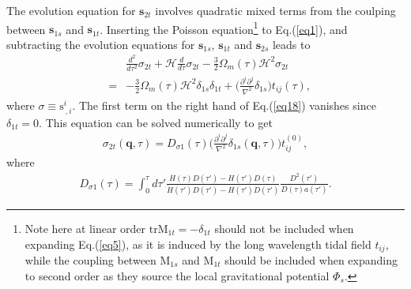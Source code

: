 \documentclass[aps,prd,twocolumn,showpacs,superscriptaddress,groupedaddress,nofootinbib]{revtex4}  %
\newcommand{\mr}{\mathrm}
\newcommand{\mb}{\mathbf}
\begin{document}
The evolution equation for $\mb{s}_{2t}$ involves quadratic mixed terms from
the coulping between $\mb{s}_{1s}$ and $\mb{s}_{1t}$. Inserting the Poisson 
equation\footnote{Note here at linear order $\mr{tr}\mr{M}_{1t}=-\delta_{1t}$
should not be included when expanding Eq.(\ref{eq5}), as it is induced by the 
long wavelength tidal field $t_{ij}$, while the coupling between $\mr{M}_{1s}$ 
and $\mr{M}_{1t}$ should be included when expanding to second order as they 
source the local gravitational potential $\Phi_s$.}
to Eq.(\ref{eq1}), and subtracting the evolution equations for $\mb{s}_{1s}$,
$\mb{s}_{1t}$ and $\mb{s}_{2s}$ leads to
\begin{eqnarray}
\label{eq18}
&&\frac{d^2}{d\tau^2}\sigma_{2t}+\mathcal{H}\frac{d}{d\tau}\sigma_{2t}-
\frac{3}{2}\Omega_m(\tau)\mathcal{H}^2\sigma_{2t} \nonumber \\
&=&-\frac{3}{2}\Omega_m(\tau)\mathcal{H}^2
\delta_{1s}\delta_{1t}
+\bigg(\frac{\partial^i\partial^j}{\nabla^2}\delta_{1s}\bigg)
t_{ij}(\tau),
\end{eqnarray}
where $\sigma\equiv\mr{s}^i_{\ ,i}$.
The first term on the right hand of Eq.(\ref{eq18}) vanishes since 
$\delta_{1t}=0$.
This equation can be solved numerically to get 
\begin{eqnarray}
\sigma_{2t}(\bm{q},\tau)=D_{\sigma1}(\tau)
\bigg(\frac{\partial^i\partial^j}{\nabla^2}\delta_{1s}(\bm{q},\tau)
\bigg)t_{ij}^{(0)},
\end{eqnarray}
where
\begin{eqnarray}
D_{\sigma1}(\tau)=
\int^\tau_0d\tau'
\frac{H(\tau)D(\tau')-H(\tau')D(\tau)}{\dot{H}(\tau')D(\tau')-
H(\tau')\dot{D}(\tau')}\frac{D^2(\tau')}{D(\tau)a(\tau')}.
\end{eqnarray}
\end{document}
